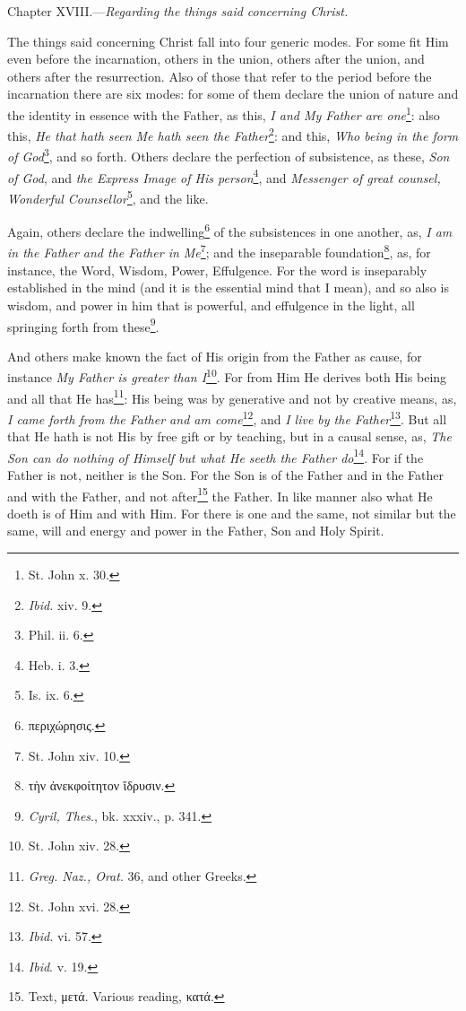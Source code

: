 
Chapter XVIII.—\emph{Regarding the things said concerning Christ.}

The things said concerning Christ fall into four generic modes. For some fit Him even before the incarnation, others in the union, others after the union, and others after the resurrection. Also of those that refer to the period before the incarnation there are six modes: for some of them declare the union of nature and the identity in essence with the Father, as this, \emph{I and My Father are one}\footnote{St. John x. 30.}: also this, \emph{He that hath seen Me hath seen the Father}\footnote{\emph{Ibid.} xiv. 9.}: and this, \emph{Who being in the form of God}\footnote{Phil. ii. 6.}, and so forth. Others declare the perfection of subsistence, as these, \emph{Son of God}, and \emph{the Express Image of His person}\footnote{Heb. i. 3.}, and \emph{Messenger of great counsel, Wonderful Counsellor}\footnote{Is. ix. 6.}, and the like.

Again, others declare the indwelling\footnote{\textgreek{περιχώρησις}.} of the subsistences in one another, as, \emph{I am in the Father and the Father in Me}\footnote{St. John xiv. 10.}; and the inseparable foundation\footnote{\textgreek{τὴν ἀνεκφοίτητον ἵδρυσιν}.}, as, for instance, the Word, Wisdom, Power, Effulgence. For the word is inseparably established in the mind (and it is the essential mind that I mean), and so also is wisdom, and power in him that is powerful, and effulgence in the light, all springing forth from these\footnote{\emph{Cyril, Thes}., bk. xxxiv., p. 341.}.

And others make known the fact of His origin from the Father as cause, for instance \emph{My Father is greater than I}\footnote{St. John xiv. 28.}. For from Him He derives both His being and all that He has\footnote{\emph{Greg. Naz., Orat}. 36, and other Greeks.}: His being was by generative and not by creative means, as, \emph{I came forth from the Father and am come}\footnote{St. John xvi. 28.}, and \emph{I live by the Father}\footnote{\emph{Ibid. }vi. 57.}\emph{}. But all that He hath is not His by free gift or by teaching, but in a causal sense, as, \emph{The Son can do nothing of Himself but what He seeth the Father do}\footnote{\emph{Ibid}. v. 19.}. For if the Father is not, neither is the Son. For the Son is of the Father and in the Father and with the Father, and not after\footnote{Text, \textgreek{μετά}. Various reading, \textgreek{κατά}.} the Father. In like manner also what He doeth is of Him and with Him. For there is one and the same, not similar but the same, will and energy and power in the Father, Son and Holy Spirit.

